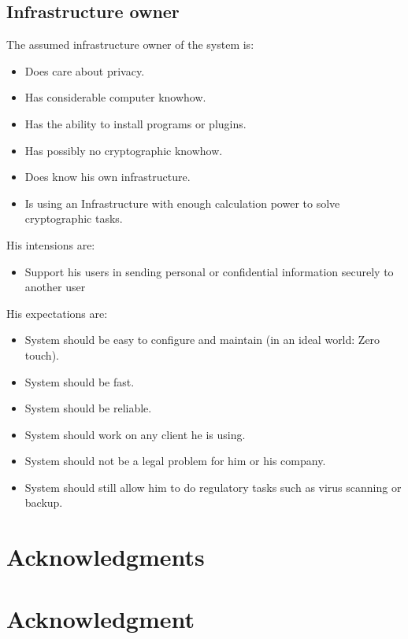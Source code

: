 \documentclass[12pt,journal,compsoc,peerreview]{IEEEtran}
\begin{document}
\subsection{Infrastructure owner}
The assumed infrastructure owner of the system is:
\begin{itemize}
	\item Does care about privacy.
	\item Has considerable computer knowhow.
	\item Has the ability to install programs or plugins.
	\item Has possibly no cryptographic knowhow.
	\item Does know his own infrastructure.
	\item Is using an Infrastructure with enough calculation power to solve cryptographic tasks.
\end{itemize}
His intensions are:
\begin{itemize}
	\item Support his users in sending personal or confidential information securely to another user
\end{itemize}
His expectations are:
\begin{itemize}
	\item System should be easy to configure and maintain (in an ideal world: Zero touch). 
	\item System should be fast.
	\item System should be reliable.
	\item System should work on any client he is using.
	\item System should not be a legal problem for him or his company.
	\item System should still allow him to do regulatory tasks such as virus scanning or backup.
\end{itemize}


\ifCLASSOPTIONcompsoc
  \section*{Acknowledgments}
\else
  \section*{Acknowledgment}
\fi
\end{document}
